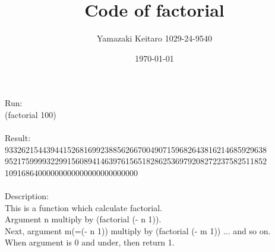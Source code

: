 \documentclass[a4paper,12pt]{article}
\begin{document}
\title{Code of factorial}
\author{Yamazaki Keitaro 1029-24-9540}
\date{\today}
\maketitle

\lstset{numbers=left,basicstyle=\small}


{\large Run:}\\
  (factorial 100)\\
\\
{\large Result:}\\
  933262154439441526816992388562667004907159682643816214685929638\\
  952175999932299156089414639761565182862536979208272237582511852\\
  10916864000000000000000000000000\\
\\
{\large Description:}\\
  This is a function which calculate factorial.\\
  Argument n multiply by (factorial (- n 1)).\\
  Next, argument m(=(- n 1)) multiply by (factorial (- m 1)) ... and so on.\\
  When argument is 0 and under, then return 1.\\
\\
\end{document}
